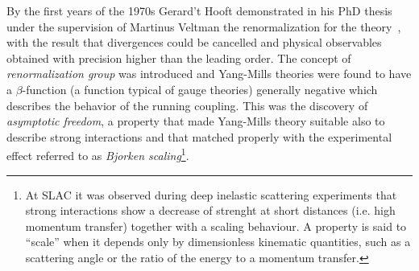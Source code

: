 By the first years of the 1970s Gerard't Hooft demonstrated in his
PhD thesis under the supervision of  Martinus Veltman the
renormalization for the theory~\cite{tHooft1971173,Hooft1971167}, 
with the result that divergences could be 
cancelled and physical observables obtained with precision higher than the 
leading order. 
The concept of \textit{renormalization group} was introduced and 
Yang-Mills theories were found to have a $\beta$-function (a function 
typical of gauge theories) generally negative which describes
the behavior of the running coupling.
 This was the discovery 
of \textit{asymptotic freedom}, a property that made Yang-Mills theory 
suitable also to describe strong interactions and that matched properly 
with the experimental effect referred to as \textit{Bjorken scaling}\footnote{At 
SLAC it was observed during deep inelastic scattering experiments that 
strong interactions show a decrease of strenght at short distances (i.e. 
high momentum transfer) together with a scaling behaviour. A property is 
said to ``scale'' when it depends only by dimensionless kinematic quantities, 
such as a scattering angle or the ratio of the energy to a momentum transfer.}. 

